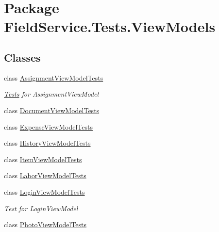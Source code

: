 \hypertarget{namespace_field_service_1_1_tests_1_1_view_models}{\section{Package Field\+Service.\+Tests.\+View\+Models}
\label{namespace_field_service_1_1_tests_1_1_view_models}
}
\subsection*{Classes}
\begin{DoxyCompactItemize}
\item 
class \hyperlink{class_field_service_1_1_tests_1_1_view_models_1_1_assignment_view_model_tests}{Assignment\+View\+Model\+Tests}
\begin{DoxyCompactList}\small\item\em \hyperlink{namespace_field_service_1_1_tests}{Tests} for Assignment\+View\+Model \end{DoxyCompactList}\item 
class \hyperlink{class_field_service_1_1_tests_1_1_view_models_1_1_document_view_model_tests}{Document\+View\+Model\+Tests}
\item 
class \hyperlink{class_field_service_1_1_tests_1_1_view_models_1_1_expense_view_model_tests}{Expense\+View\+Model\+Tests}
\item 
class \hyperlink{class_field_service_1_1_tests_1_1_view_models_1_1_history_view_model_tests}{History\+View\+Model\+Tests}
\item 
class \hyperlink{class_field_service_1_1_tests_1_1_view_models_1_1_item_view_model_tests}{Item\+View\+Model\+Tests}
\item 
class \hyperlink{class_field_service_1_1_tests_1_1_view_models_1_1_labor_view_model_tests}{Labor\+View\+Model\+Tests}
\item 
class \hyperlink{class_field_service_1_1_tests_1_1_view_models_1_1_login_view_model_tests}{Login\+View\+Model\+Tests}
\begin{DoxyCompactList}\small\item\em Test for Login\+View\+Model \end{DoxyCompactList}\item 
class \hyperlink{class_field_service_1_1_tests_1_1_view_models_1_1_photo_view_model_tests}{Photo\+View\+Model\+Tests}
\end{DoxyCompactItemize}
